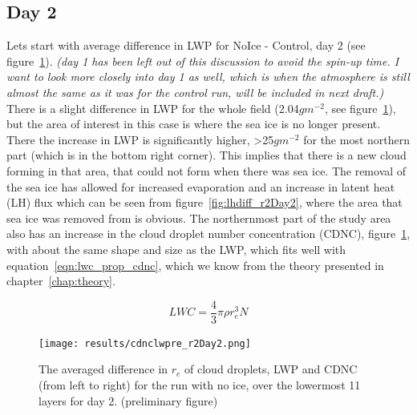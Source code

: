 \subsection{Day 2}
Lets start with average difference in LWP for NoIce - Control, day 2 (see figure~\ref{fig:relwpcdnc_r2Day2}). \textit{(day 1 has been left out of this discussion to avoid the spin-up time. I want to look more closely into day 1 as well, which is when the atmosphere is still almost the same as it was for the control run, will be included in next draft.)} There is a slight difference in LWP for the whole field (2.04$gm^{-2}$, see figure~\ref{fig:relwpcdnc_r2Day2}), but the area of interest in this case is where the sea ice is no longer present. There the increase in LWP is significantly higher, >25$gm^{-2}$ for the most northern part (which is in the bottom right corner). This implies that there is a new cloud forming in that area, that could not form when there was sea ice. The removal of the sea ice has allowed for increased evaporation and an increase in latent heat (LH) flux which can be seen from figure~\ref{fig:lhdiff_r2Day2}, where the area that sea ice was removed from is obvious. The northernmost part of the study area also has an increase in the cloud droplet number concentration (CDNC), figure~\ref{fig:relwpcdnc_r2Day2}, with about the same shape and size as the LWP, which fits well with equation~\ref{eqn:lwc_prop_cdnc}, which we know from the theory presented in chapter~\ref{chap:theory}. 

\begin{equation}
\label{eqn:lwc_prop_cdnc}
LWC = \frac{4}{3}\pi \rho r_e^3 N
\end{equation}

\begin{figure}[h!]
\centering
\texttt{[image: results/cdnclwpre\_r2Day2.png]}
\caption{The averaged difference in $r_e$ of cloud droplets, LWP and CDNC (from left to right) for the run with no ice, over the lowermost 11 layers for day 2. (preliminary figure)}
\label{fig:relwpcdnc_r2Day2}
\end{figure}

